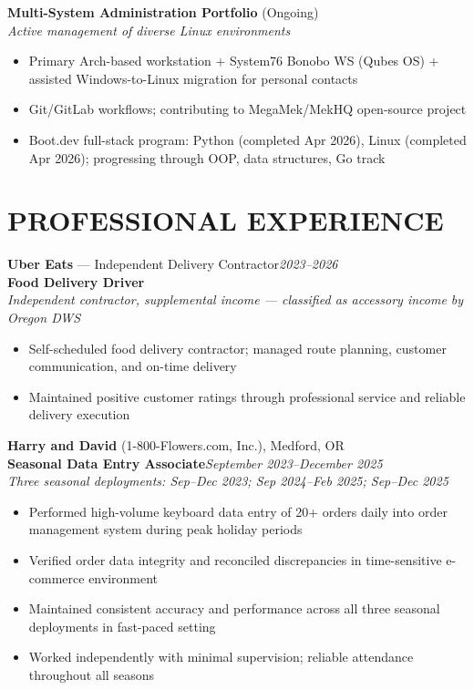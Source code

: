\documentclass[9pt,letterpaper]{extarticle}
\begin{document}
\vspace{4pt}
\noindent\textbf{Multi-System Administration Portfolio} (Ongoing)\\
\textit{Active management of diverse Linux environments}
\begin{itemize}
  \item Primary Arch-based workstation + System76 Bonobo WS (Qubes OS) + assisted Windows-to-Linux migration for personal contacts
  \item Git/GitLab workflows; contributing to MegaMek/MekHQ open-source project
  \item Boot.dev full-stack program: Python (completed Apr 2026), Linux (completed Apr 2026); progressing through OOP, data structures, Go track
\end{itemize}

\section*{PROFESSIONAL EXPERIENCE}

\noindent\textbf{Uber Eats} --- Independent Delivery Contractor\hfill\textit{2023--2026}\\
\textbf{Food Delivery Driver}\\
\textit{Independent contractor, supplemental income --- classified as accessory income by Oregon DWS}
\begin{itemize}
  \item Self-scheduled food delivery contractor; managed route planning, customer communication, and on-time delivery
  \item Maintained positive customer ratings through professional service and reliable delivery execution
\end{itemize}

\vspace{5pt}
\noindent\textbf{Harry and David} (1-800-Flowers.com, Inc.), Medford, OR\\
\textbf{Seasonal Data Entry Associate}\hfill\textit{September 2023--December 2025}\\
\textit{Three seasonal deployments: Sep--Dec 2023; Sep 2024--Feb 2025; Sep--Dec 2025}
\begin{itemize}
  \item Performed high-volume keyboard data entry of 20+ orders daily into order management system during peak holiday periods
  \item Verified order data integrity and reconciled discrepancies in time-sensitive e-commerce environment
  \item Maintained consistent accuracy and performance across all three seasonal deployments in fast-paced setting
  \item Worked independently with minimal supervision; reliable attendance throughout all seasons
\end{itemize}
\end{document}
